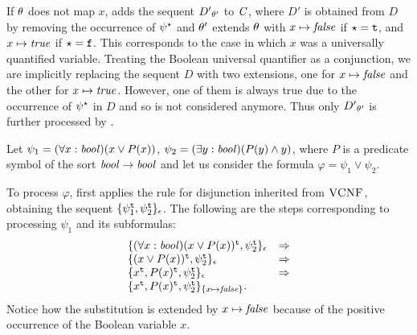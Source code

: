 If $\theta$ does not map $x$, \nfcnf{} adds the sequent ${D'}_{\theta'}$ to $\mathit{C}$, where $D'$ is obtained from $D$ by removing the occurrence of ${\psi}^{\star}$ and $\theta'$ extends $\theta$ with $x \mapsto \mathit{false}$ if $\star=\mathtt{t}$, and $x \mapsto \mathit{true}$ if $\star=\mathtt{f}$. 
This corresponds to the case in which $x$ was a universally quantified variable.
Treating the Boolean universal quantifier as a conjunction, we are implicitly replacing the sequent $D$ with two extensions, one for $x \mapsto \mathit{false}$ and the other for $x \mapsto \mathit{true}$. However, one of them is always true due to the occurrence of ${\psi}^{\star}$ in $D$ and so is not considered anymore. Thus only ${D'}_{\theta'}$ is further processed by \nfcnf{}.

\begin{example*} Let $\psi_1 = (\forall x:\mathit{bool})(x \lor P(x))$, $\psi_2 = (\exists y:\mathit{bool})(P(y) \land y)$,
where $P$ is a predicate symbol of the sort $\mathit{bool} \to \mathit{bool}$ and let us consider the formula $\varphi = \psi_1 \lor \psi_2$.

To process $\varphi$, \nfcnf{} first applies the rule for disjunction inherited from $\textsc{VCNF}$,
obtaining the sequent $\{\psi_1^{\mathtt{t}}, \psi_2^{\mathtt{t}}\}_\epsilon$. The following are the steps corresponding to processing 
$\psi_1$ and its subformulas:
\[
\begin{array}{ll}
\{(\forall x:\mathit{bool})(x \lor P(x))^{\mathtt{t}}, \psi_2^{\mathtt{t}}\}_\epsilon & \Rightarrow \\
\{(x \lor P(x))^{\mathtt{t}}, \psi_2^{\mathtt{t}}\}_\epsilon & \Rightarrow \\
\{x^{\mathtt{t}}, P(x)^{\mathtt{t}}, \psi_2^{\mathtt{t}}\}_\epsilon & \Rightarrow \\
\{x^{\mathtt{t}}, P(x)^{\mathtt{t}}, \psi_2^{\mathtt{t}}\}_{\{x \mapsto \mathit{false}\}}.\\
\end{array}
\]
Notice how the substitution is extended by $x \mapsto \mathit{false}$ because of the positive occurrence of the Boolean variable $x$.


\end{example*}
